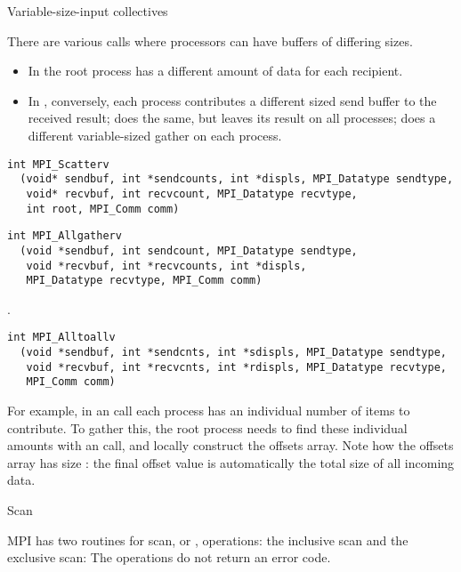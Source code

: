  {Variable-size-input collectives}

There are various calls where processors can have
buffers of differing sizes.
\begin{itemize}
\item In  the root process has a different
  amount of data for each recipient.
\item In , conversely, each process
  contributes a different sized send buffer to the received result;
   does the same, but leaves its result
  on all processes;  does a different
  variable-sized gather on each process.
\end{itemize}

\begin{verbatim}
int MPI_Scatterv
  (void* sendbuf, int *sendcounts, int *displs, MPI_Datatype sendtype, 
   void* recvbuf, int recvcount, MPI_Datatype recvtype, 
   int root, MPI_Comm comm)
\end{verbatim}


\begin{verbatim}
int MPI_Allgatherv
  (void *sendbuf, int sendcount, MPI_Datatype sendtype, 
   void *recvbuf, int *recvcounts, int *displs, 
   MPI_Datatype recvtype, MPI_Comm comm)
\end{verbatim}

.
\begin{verbatim}
int MPI_Alltoallv
  (void *sendbuf, int *sendcnts, int *sdispls, MPI_Datatype sendtype, 
   void *recvbuf, int *recvcnts, int *rdispls, MPI_Datatype recvtype,
   MPI_Comm comm)
\end{verbatim}

For example, in an  call each process has an individual
number of items to contribute. To gather this, the root process needs
to find these individual amounts with an  call, and
locally construct the offsets array. Note how the offsets array has
size : the final offset value is automatically the total
size of all incoming data.  
%

 {Scan}

MPI has two routines for scan, or , operations:
the inclusive scan
%
%
and the exclusive scan:
%
%
The  operations do not return an error code.

